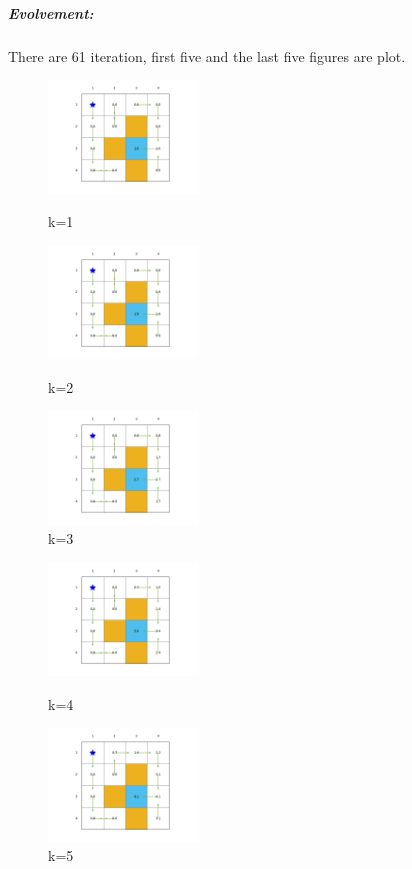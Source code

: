 \documentclass[UTF8]{ctexart}
\begin{document}
	\subparagraph{Evolvement:} There are 61 iteration,  first five and the last five figures are plot.
	\begin{figure}[H]
			\centering
			\begin{minipage}[t]{0.3\textwidth}
				\centering
				\includegraphics[width=4cm,height=3cm]{fig/PolicyAndState_0}
				\caption{k=1}
			\end{minipage}
			\begin{minipage}[t]{0.3\textwidth}
				\centering
				\includegraphics[width=4cm,height=3cm]{fig/PolicyAndState_1}
				\caption{k=2}
			\end{minipage}
			\begin{minipage}[t]{0.3\textwidth}
				\centering
				\includegraphics[width=4cm,height=3cm]{fig/PolicyAndState_2}
				\caption{k=3}
			\end{minipage}
		\end{figure}
	\begin{figure}[H]
		\centering
		\begin{minipage}[t]{0.45\textwidth}
			\centering
			\includegraphics[width=4cm,height=3cm]{fig/PolicyAndState_3}
			\caption{k=4}
		\end{minipage}
		\begin{minipage}[t]{0.45\textwidth}
			\centering
			\includegraphics[width=4cm,height=3cm]{fig/PolicyAndState_4}
			\caption{k=5}
		\end{minipage}
	\end{figure}
\end{document}
